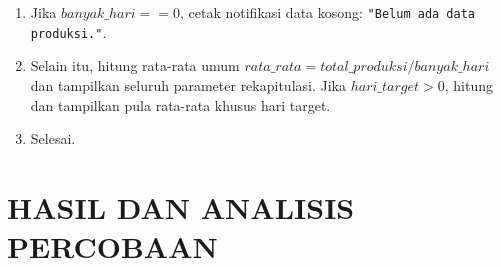 \documentclass[12pt,a4paper]{article}
\begin{document}
\begin{enumerate}
\begin{enumerate}[label=\alph*.]
\begin{enumerate}[label=\roman*.]
            \item Tambahkan akumulasi total: $total\_produksi = total\_produksi + produksi$.
            \item Pengujian rekaman pertama: jika $banyak\_hari == 1$:
            \begin{itemize}
                \item Tetapkan $tertinggi = produksi$, $hari\_tertinggi = 1$.
                \item Tetapkan $terendah = produksi$, $hari\_terendah = 1$.
            \end{itemize}
            \item Untuk hari kedua dan seterusnya ($banyak\_hari > 1$):
            \begin{itemize}
                \item Jika $produksi > tertinggi$, perbarui $tertinggi = produksi$ dan $hari\_tertinggi = banyak\_hari$.
                \item Jika $produksi < terendah$, perbarui $terendah = produksi$ dan $hari\_terendah = banyak\_hari$.
            \end{itemize}
            \item Pengujian hari target: jika $produksi \ge TARGET$, tambahkan $hari\_target = hari\_target + 1$ dan $total\_target = total\_target + produksi$.
            \item Baca masukan produksi hari berikutnya ($banyak\_hari + 1$) ke variabel \texttt{produksi}.
        \end{enumerate}
        \item Jika $banyak\_hari == 0$, cetak notifikasi data kosong: \texttt{"Belum ada data produksi."}.
        \item Selain itu, hitung rata-rata umum $rata\_rata = total\_produksi / banyak\_hari$ dan tampilkan seluruh parameter rekapitulasi. Jika $hari\_target > 0$, hitung dan tampilkan pula rata-rata khusus hari target.
        \item Selesai.
    \end{enumerate}
\end{enumerate}

\section{HASIL DAN ANALISIS PERCOBAAN}
\end{document}
